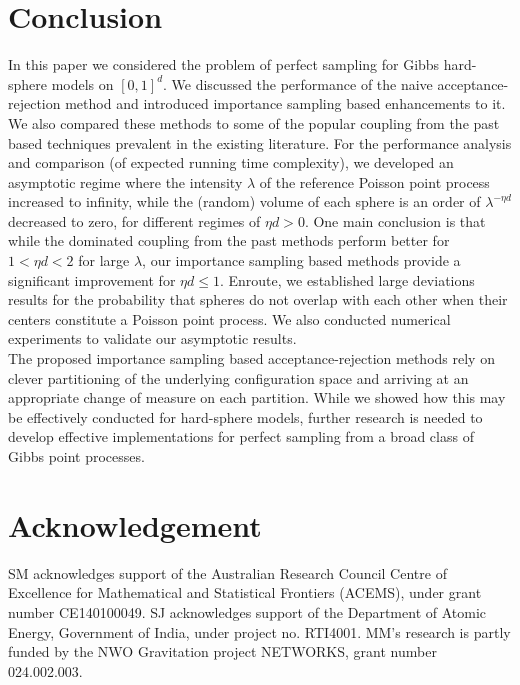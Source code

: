 \documentclass[11pt]{article}
\begin{document}
\section{Conclusion}
\label{sec:ConAR}
In this paper we considered the problem of perfect sampling for Gibbs hard-sphere models on $[0,1]^d$.  We discussed the performance of the naive acceptance-rejection method and introduced importance sampling based enhancements to it. We also compared these methods to some of the popular coupling from the past based techniques prevalent in the existing literature. For the performance  analysis and comparison (of expected running time complexity), we developed an asymptotic regime where the intensity 
$\lambda$ of the reference Poisson point process increased to infinity, while the (random) volume of each sphere is an order of $\lambda^{- \eta d}$ decreased to zero, for different regimes of $\eta d > 0$.
One main conclusion is that while the dominated coupling from the past methods perform better for $1< \eta d < 2$ for large $\lambda$,
our importance sampling based methods provide a significant improvement for $\eta d \leq 1$. Enroute, we established large deviations results for the probability that spheres do not overlap with each other when their centers constitute a Poisson point process.
We also conducted numerical experiments to validate our asymptotic results. \\

The  proposed importance sampling based acceptance-rejection methods rely on clever partitioning of the underlying configuration space and arriving at an appropriate change of measure on each partition. While we showed how this may be effectively conducted for hard-sphere models, further research is needed to develop effective implementations for perfect sampling from a broad class of Gibbs point processes.





\section*{Acknowledgement}
SM acknowledges support of the Australian Research Council Centre of Excellence for Mathematical and Statistical Frontiers (ACEMS), under grant number CE140100049. SJ acknowledges support of the Department of Atomic Energy, Government of India, under project no. RTI4001. MM's research is partly funded by the NWO Gravitation project NETWORKS, grant number 024.002.003.
\end{document}
